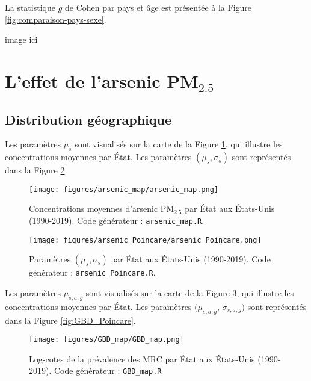 La statistique $g$ de Cohen par pays et âge est présentée à la Figure \ref{fig:comparaison-pays-sexe}.

image ici

\section{L'effet de l'arsenic PM$_{2.5}$}

\subsection{Distribution géographique}

Les paramètres $\mu_s$ sont visualisés sur la carte de la Figure \ref{fig:arsenic-map}, qui illustre les concentrations moyennes par État. Les paramètres $(\mu_s, \sigma_s)$ sont représentés dans la Figure \ref{fig:arsenic_Poincare}.

\begin{figure}[H]
	\centering
	\texttt{[image: figures/arsenic\_map/arsenic\_map.png]}
	\caption{Concentrations moyennes d'arsenic PM$_{2.5}$ par État aux États-Unis (1990-2019). Code générateur : \texttt{arsenic\_map.R}.}
	\label{fig:arsenic-map}
\end{figure}

\begin{figure}[H]
	\centering
	\texttt{[image: figures/arsenic\_Poincare/arsenic\_Poincare.png]}
	\caption{Paramètres $(\mu_s, \sigma_s)$ par État aux États-Unis (1990-2019). Code générateur : \texttt{arsenic\_Poincare.R}.}
	\label{fig:arsenic_Poincare}
\end{figure}

Les paramètres $\mu_{s,a,g}$ sont visualisés sur la carte de la Figure \ref{fig:GBD-map}, qui illustre les concentrations moyennes par État. Les paramètres $(\mu_{s,a,g}$, $\sigma_{s,a,g})$ sont représentés dans la Figure \ref{fig:GBD_Poincare}.

\begin{figure}[H]
	\centering
	\texttt{[image: figures/GBD\_map/GBD\_map.png]}
	\caption{Log-cotes de la prévalence des MRC par État aux États-Unis (1990-2019). Code générateur : \texttt{GBD\_map.R}}
	\label{fig:GBD-map}
\end{figure}


